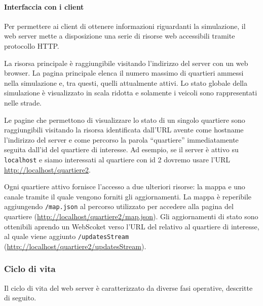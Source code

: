 \paragraph*{Interfaccia con i client}
Per permettere ai client di ottenere informazioni riguardanti la simulazione, il
web server mette a disposizione una serie di risorse web accessibili tramite
protocollo HTTP. 

La risorsa principale è raggiungibile visitando l'indirizzo del server con un
web browser.
La pagina principale elenca il numero massimo di quartieri ammessi nella
simulazione e, tra questi, quelli attualmente attivi. Lo stato globale della
simulazione è visualizzato in scala ridotta e solamente i veicoli sono
rappresentati nelle strade.

Le pagine che permettono di visualizzare lo stato di un singolo quartiere sono
raggiungibili visitando la risorsa identificata dall'URL avente come hostname
l'indirizzo del server e come percorso la parola ``quartiere'' immediatamente
seguita dall'id del quartiere di interesse. Ad esempio, se il server è attivo su
\texttt{localhost} e siamo interessati al quartiere con id 2 dovremo usare l'URL
\url{http://localhost/quartiere2}.

Ogni quartiere attivo fornisce l'accesso a due ulteriori risorse: la mappa e uno
canale tramite il quale vengono forniti gli aggiornamenti.
La mappa è reperibile aggiungendo \texttt{/map.json} al percorso utilizzato per
accedere alla pagina del quartiere (\url{http://localhost/quartiere2/map.json}).
Gli aggiornamenti di stato sono ottenibili aprendo un WebScoket verso l'URL del
relativo al quartiere di interesse, al quale viene aggiunto
\texttt{/updatesStream} (\url{http://localhost/quartiere2/updatesStream}).

\subsubsection{Ciclo di vita}
Il ciclo di vita del web server è caratterizzato da diverse fasi operative,
descritte di seguito.

